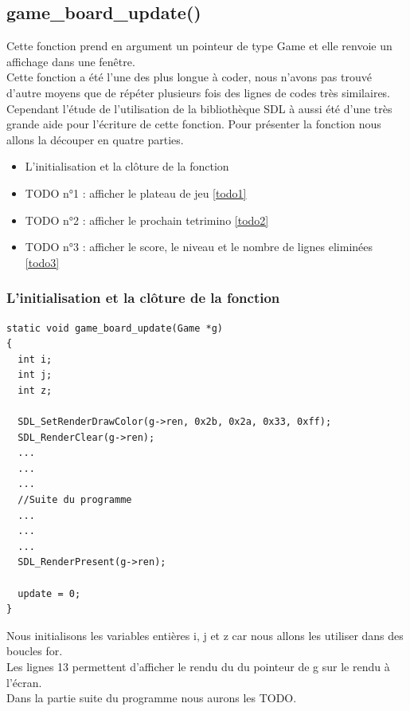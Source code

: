 \documentclass[a4paper,10p]{report}
\begin{document}
\subsection{game\_board\_update()}
\label{game_board_update}
Cette fonction prend en argument un pointeur de type Game et elle renvoie un affichage dans une fenêtre. 
\\ Cette fonction a été l'une des plus longue à coder, nous n'avons pas trouvé d'autre moyens que de répéter plusieurs fois des lignes de codes très similaires. Cependant l'étude de l'utilisation de la bibliothèque SDL à aussi été d'une très grande aide pour l'écriture de cette fonction. Pour présenter la fonction nous allons la découper en quatre parties.
\begin{itemize}
    \item L'initialisation et la clôture de la fonction
    \item TODO n°1 : afficher le plateau de jeu \ref{todo1}
    \item TODO n°2 : afficher le prochain tetrimino \ref{todo2}
    \item TODO n°3 : afficher le score, le niveau et le nombre de lignes eliminées \ref{todo3}
\end{itemize}
\subsubsection{L'initialisation et la clôture de la fonction}
\begin{lstlisting}
static void game_board_update(Game *g)
{
  int i;
  int j;
  int z;

  SDL_SetRenderDrawColor(g->ren, 0x2b, 0x2a, 0x33, 0xff);
  SDL_RenderClear(g->ren);
  ...
  ...
  ...
  //Suite du programme
  ...
  ...
  ...
  SDL_RenderPresent(g->ren);

  update = 0;
}
\end{lstlisting}
Nous initialisons les variables entières i, j et z car nous allons les utiliser dans des boucles for.
\\Les lignes \textcolor{gris}{13} permettent d'afficher le rendu du du pointeur de g sur le rendu à l'écran.
\\Dans la partie suite du programme nous aurons les TODO.
\end{document}
